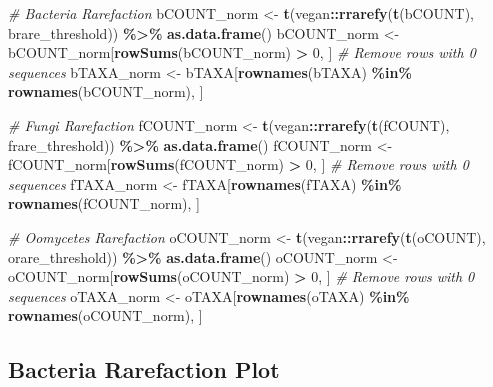 \documentclass[
  11pt,
]{article}
\newenvironment{Shaded}{\begin{snugshade}}{\end{snugshade}}
\newcommand{\CommentTok}[1]{\textcolor[rgb]{0.56,0.35,0.01}{\textit{#1}}}
\newcommand{\DecValTok}[1]{\textcolor[rgb]{0.00,0.00,0.81}{#1}}
\newcommand{\FunctionTok}[1]{\textcolor[rgb]{0.13,0.29,0.53}{\textbf{#1}}}
\newcommand{\NormalTok}[1]{#1}
\newcommand{\OtherTok}[1]{\textcolor[rgb]{0.56,0.35,0.01}{#1}}
\newcommand{\SpecialCharTok}[1]{\textcolor[rgb]{0.81,0.36,0.00}{\textbf{#1}}}
\begin{document}
\begin{Shaded}
\begin{Highlighting}[]
\CommentTok{\# Bacteria Rarefaction}
\NormalTok{bCOUNT\_norm }\OtherTok{\textless{}{-}} \FunctionTok{t}\NormalTok{(vegan}\SpecialCharTok{::}\FunctionTok{rrarefy}\NormalTok{(}\FunctionTok{t}\NormalTok{(bCOUNT), brare\_threshold)) }\SpecialCharTok{\%\textgreater{}\%} \FunctionTok{as.data.frame}\NormalTok{()}
\NormalTok{bCOUNT\_norm }\OtherTok{\textless{}{-}}\NormalTok{ bCOUNT\_norm[}\FunctionTok{rowSums}\NormalTok{(bCOUNT\_norm) }\SpecialCharTok{\textgreater{}} \DecValTok{0}\NormalTok{, ]  }\CommentTok{\# Remove rows with 0 sequences}
\NormalTok{bTAXA\_norm }\OtherTok{\textless{}{-}}\NormalTok{ bTAXA[}\FunctionTok{rownames}\NormalTok{(bTAXA) }\SpecialCharTok{\%in\%} \FunctionTok{rownames}\NormalTok{(bCOUNT\_norm), ]}

\CommentTok{\# Fungi Rarefaction}
\NormalTok{fCOUNT\_norm }\OtherTok{\textless{}{-}} \FunctionTok{t}\NormalTok{(vegan}\SpecialCharTok{::}\FunctionTok{rrarefy}\NormalTok{(}\FunctionTok{t}\NormalTok{(fCOUNT), frare\_threshold)) }\SpecialCharTok{\%\textgreater{}\%} \FunctionTok{as.data.frame}\NormalTok{()}
\NormalTok{fCOUNT\_norm }\OtherTok{\textless{}{-}}\NormalTok{ fCOUNT\_norm[}\FunctionTok{rowSums}\NormalTok{(fCOUNT\_norm) }\SpecialCharTok{\textgreater{}} \DecValTok{0}\NormalTok{, ]  }\CommentTok{\# Remove rows with 0 sequences}
\NormalTok{fTAXA\_norm }\OtherTok{\textless{}{-}}\NormalTok{ fTAXA[}\FunctionTok{rownames}\NormalTok{(fTAXA) }\SpecialCharTok{\%in\%} \FunctionTok{rownames}\NormalTok{(fCOUNT\_norm), ]}

\CommentTok{\# Oomycetes Rarefaction}
\NormalTok{oCOUNT\_norm }\OtherTok{\textless{}{-}} \FunctionTok{t}\NormalTok{(vegan}\SpecialCharTok{::}\FunctionTok{rrarefy}\NormalTok{(}\FunctionTok{t}\NormalTok{(oCOUNT), orare\_threshold)) }\SpecialCharTok{\%\textgreater{}\%} \FunctionTok{as.data.frame}\NormalTok{()}
\NormalTok{oCOUNT\_norm }\OtherTok{\textless{}{-}}\NormalTok{ oCOUNT\_norm[}\FunctionTok{rowSums}\NormalTok{(oCOUNT\_norm) }\SpecialCharTok{\textgreater{}} \DecValTok{0}\NormalTok{, ]  }\CommentTok{\# Remove rows with 0 sequences}
\NormalTok{oTAXA\_norm }\OtherTok{\textless{}{-}}\NormalTok{ oTAXA[}\FunctionTok{rownames}\NormalTok{(oTAXA) }\SpecialCharTok{\%in\%} \FunctionTok{rownames}\NormalTok{(oCOUNT\_norm), ]}
\end{Highlighting}
\end{Shaded}

\subsection{Bacteria Rarefaction Plot}\label{bacteria-rarefaction-plot}
\end{document}

